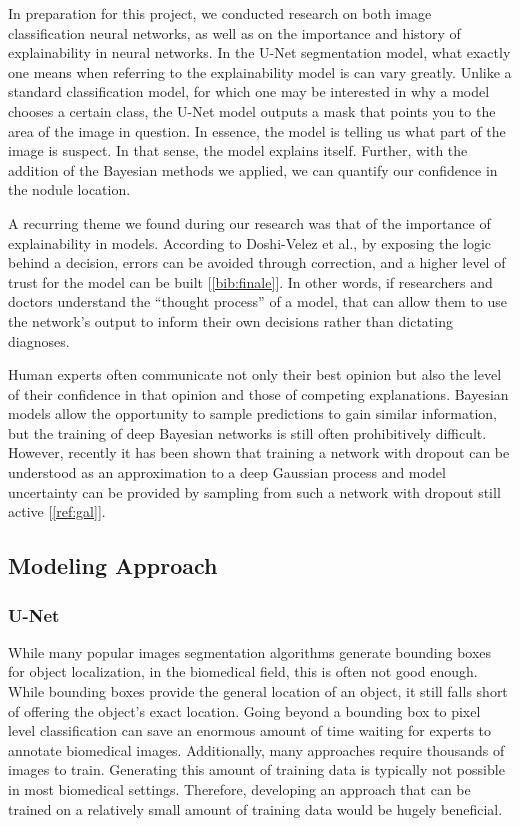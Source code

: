 \documentclass[12pt]{article}
\begin{document}
{In preparation for this project, we conducted research on both image classification neural networks, as well as on the importance and history of explainability in neural networks. In the U-Net segmentation model, what exactly one means when referring to the explainability model is can vary greatly. Unlike a standard classification model, for which one may be interested in why a model chooses a certain class, the U-Net model outputs a mask that points you to the area of the image in question. In essence, the model is telling us what part of the image is suspect. In that sense, the model explains itself. Further, with the addition of the Bayesian methods we applied, we can quantify our confidence in the nodule location.

A recurring theme we found during our research was that of the importance of explainability in models. According to Doshi-Velez et al., by exposing the logic behind a decision, errors can be avoided through correction, and a higher level of trust for the model can be built [\ref{bib:finale}]. In other words, if researchers and doctors understand the ``thought process'' of a model,  that can allow them to use the network's output to inform their own decisions rather than dictating diagnoses. 

Human experts often communicate not only their best opinion but also the level of their confidence in that opinion and those of competing explanations. Bayesian models allow the opportunity to sample predictions to gain similar information, but the training of deep Bayesian networks is still often prohibitively difficult. However, recently it has been shown that training a network with dropout can be understood as an approximation to a deep Gaussian process and model uncertainty can be provided by sampling from such a network with dropout still active {[}\ref{ref:gal}{]}.

\subsection*{Modeling Approach}

\subsubsection*{U-Net}
While many popular images segmentation algorithms generate bounding boxes for object localization, in the biomedical field, this is often not good enough. While bounding boxes provide the general location of an object, it still falls short of offering the object's exact location. Going beyond a bounding box to pixel level classification can save an enormous amount of time waiting for experts to annotate biomedical images. Additionally, many approaches require thousands of images to train. Generating this amount of training data is typically not possible in most biomedical settings. Therefore, developing an approach that can be trained on a relatively small amount of training data would be hugely beneficial.  

}
\end{document}
